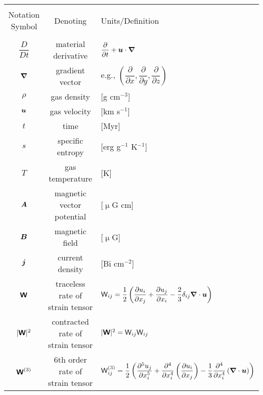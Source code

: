 \documentclass[preprint2]{aastex63}
\newcommand{\vect}[1]{{{\mbox{\boldmath $#1$}}}}%
\newcommand{\mathbfss}[1]{\textbf{\textsf{#1}}}
\begin{document}
\begin{table*}[h]
\begin{tabular}{ccl}
\hline\hline\\
{Notation Symbol} & {Denoting} & {Units/Definition}\\\hline\\
 $\dfrac{D}{Dt}$ & material derivative & $\dfrac{\partial }{\partial t}+\vect{u}\cdot \vect\nabla$ \\
 $\vect\nabla$ & gradient vector & e.g., $\left(\dfrac{\partial }{\partial x},\dfrac{\partial }{\partial y},\dfrac{\partial }{\partial z}\right)$ \\
 $\rho$ & gas density & [g cm$^{-3}$]  \\
 $\vect u$ & gas velocity & [km s$^{-1}$] \\
 $t$ & time & [Myr] \\
 $s$ & specific entropy & [erg g$^{-1}$ K$^{-1}$] \\
 $T$ & gas temperature & [K] \\
 $\vect A$ & magnetic vector potential & [$\upmu$G cm] \\
 $\vect B$ & magnetic field & [$\upmu$G] \\
 $\vect j$ & current density & [Bi cm$^{-2}$] \\
 $\mathbfss W$ & traceless rate of strain tensor &
   ${\mathsf W}_{ij} = \dfrac{1}{2}\left(\dfrac{\partial u_i}{\partial x_j}
                  + \dfrac{\partial u_j}{\partial x_i}
                  -\dfrac{2}{3} \delta_{ij}\vect\nabla\cdot \vect u\right)$ \\
 $|\mathbfss W|^2$ & contracted rate of strain tensor &
   $|\mathbfss W|^2={\mathsf W}_{ij}{\mathsf W}_{ij}$\\
 $\mathbfss W^{(3)}$ & 6th order rate of strain tensor &
   ${\mathsf W}_{ij}^{(3)} = \dfrac{1}{2}\left(\dfrac{\partial^5 u_j}{\partial x_i^5}
                  + \dfrac{\partial^4}{\partial x_i^4}\left(\dfrac{\partial u_i}{\partial x_j}\right)
                  -\dfrac{1}{3}\dfrac{\partial^4}{\partial x_i^4}\left(\vect\nabla\cdot \vect u\right)\right)$ \\

\end{tabular}
\end{table*}
\end{document}
